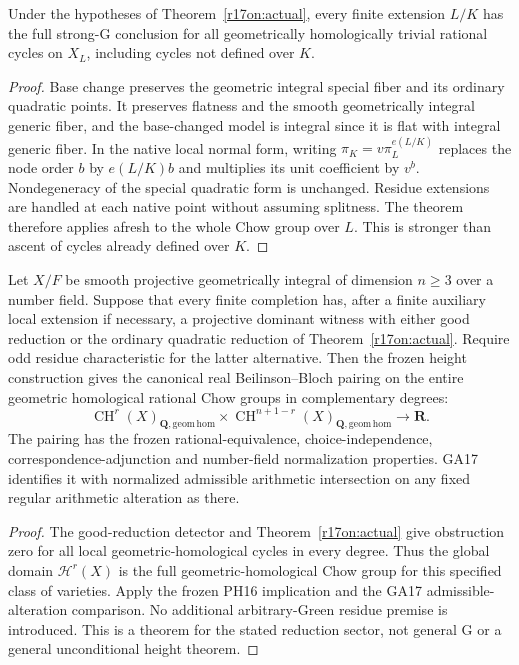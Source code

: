 \begin{corollary}
\label{r17on:extensions}
Under the hypotheses of Theorem~\ref{r17on:actual},
every finite extension $L/K$ has the full strong-G
conclusion for all geometrically homologically trivial
rational cycles on $X_L$, including cycles not defined
over $K$.
\end{corollary}

\begin{proof}
Base change preserves the geometric integral special
fiber and its ordinary quadratic points. It preserves
flatness and the smooth geometrically integral generic
fiber, and the base-changed model is integral since
it is flat with integral generic fiber. In the
native local normal form, writing
$\pi_K=v\pi_L^{e(L/K)}$ replaces the node order $b$
by $e(L/K)b$ and multiplies its unit coefficient
by $v^b$. Nondegeneracy of the special quadratic
form is unchanged. Residue extensions are handled
at each native point without assuming splitness.
The theorem therefore applies afresh to the whole
Chow group over $L$. This is stronger than
ascent of cycles already defined over $K$.
\end{proof}

\begin{corollary}
\label{r17on:height}
Let $X/F$ be smooth projective geometrically integral
of dimension $n\ge3$ over a number field.
Suppose that every finite completion has, after a finite
auxiliary local extension if necessary, a projective
dominant witness with either good reduction or the
ordinary quadratic reduction of
Theorem~\ref{r17on:actual}. Require odd residue
characteristic for the latter alternative.
Then the frozen height construction gives the canonical
real Beilinson--Bloch pairing on the entire geometric
homological rational Chow groups in complementary degrees:
\[
 \operatorname{CH}^r(X)_{\mathbf Q,\mathrm{geom\,hom}}
 \times
 \operatorname{CH}^{n+1-r}(X)_{\mathbf Q,\mathrm{geom\,hom}}
                         \longrightarrow\mathbf R.
 \tag{ON17.7}\label{r17on:height-pairing}
\]
The pairing has the frozen rational-equivalence,
choice-independence, correspondence-adjunction and
number-field normalization properties. GA17 identifies
it with normalized admissible arithmetic intersection
on any fixed regular arithmetic alteration as there.
\end{corollary}

\begin{proof}
The good-reduction detector and
Theorem~\ref{r17on:actual} give obstruction zero for
all local geometric-homological cycles in every degree.
Thus the global domain $\mathcal H^r(X)$ is the full
geometric-homological Chow group for this specified
class of varieties. Apply the frozen PH16 implication
and the GA17 admissible-alteration comparison.
No additional arbitrary-Green residue premise is
introduced. This is a theorem for the stated
reduction sector, not general G or a general
unconditional height theorem.
\end{proof}

